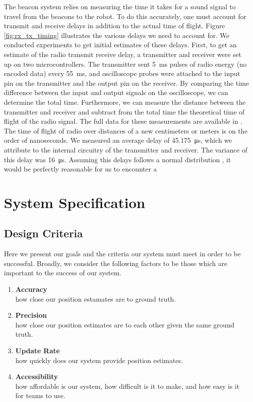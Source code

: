 \documentclass{article}
\begin{document}
The beacon system relies on measuring the time it takes for a sound signal to travel from the beacons to the robot. To do this accurately, one must account for transmit and receive delays in addition to the actual time of flight. Figure \ref{fig:rx_tx_timing} illustrates the various delays we need to account for. We conducted experiments to get initial estimates of these delays. First, to get an estimate of the radio transmit receive delay, a transmitter and receiver were set up on two microcontrollers. The transmitter sent \SI{5}{\milli\second} pulses of radio energy (no encoded data) every \SI{55}{\milli\second}, and oscilloscope probes were attached to the input pin on the transmitter and the output pin on the receiver. By comparing the time difference between the input and output signals on the oscilloscope, we can determine the total time. Furthermore, we can measure the distance between the transmitter and receiver and subtract from the total time the theoretical time of flight of the radio signal. The full data for these measurements are available in . The time of flight of radio over distances of a new centimeters or meters is on the order of nanoseconds. We measured  an average delay of \SI{45.175}{\micro\second}, which we attribute to the internal circuitry of the transmitter and receiver. The variance of this delay was \SI{16}{\micro\second}. Assuming this delays follows a normal distribution , it would be perfectly reasonable for us to encounter a

\section{System Specification} \label{specs}

\subsection{Design Criteria}

Here we present our goals and the criteria our system must meet in order to be successful. Broadly, we consider the following factors to be those which are important to the success of our system.
\begin{enumerate}
  \item \textbf{Accuracy}\\ how close our position estamates are to ground truth.
  \item \textbf{Precision}\\ how close our position estimates are to each other given the same ground truth.
  \item \textbf{Update Rate}\\ how quickly does our system provide position estimates.
  \item \textbf{Accessibility}\\ how affordable is our system, how difficult is it to make, and how easy is it for teams to use.
\end{enumerate}
\end{document}
